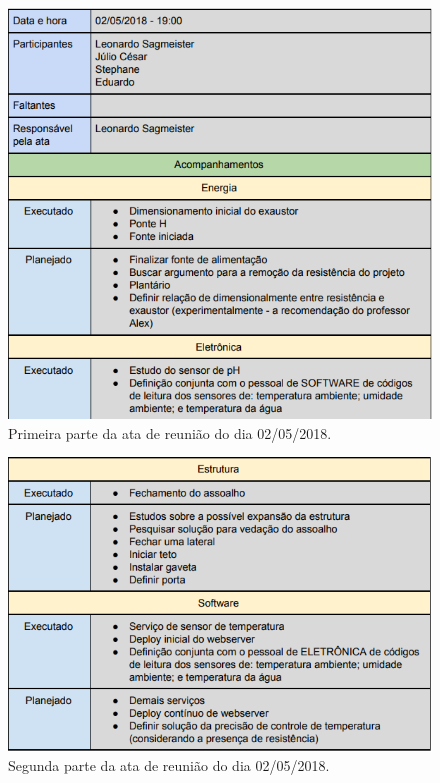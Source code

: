 \begin{apendicesenv}
\begin{figure}[H]
	\centering
	\includegraphics[width=15cm]{figuras/apendice_h_1.png}
	\caption{Primeira parte da ata de reunião do dia 02/05/2018.
	} \label{apendice_h_1}
\end{figure}

\begin{figure}[H]
	\centering
	\includegraphics[width=15cm]{figuras/apendice_h_2.png}
	\caption{Segunda parte da ata de reunião do dia 02/05/2018.
	} \label{apendice_h_2}
\end{figure}


\end{apendicesenv}

